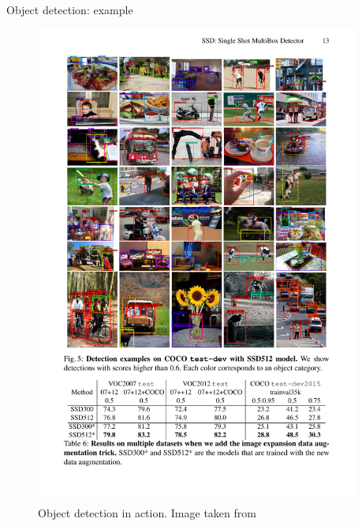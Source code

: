\documentclass[xcolor=pdftex,dvipsnames,table]{beamer}
\begin{document}
\begin{frame}{Object detection: example}
\begin{figure}[htb]
   \centering
   \includegraphics[width=0.95\textwidth]{../graphics/Detection_example2.pdf}
   \caption{Object detection in action. Image taken from \cite{Liu2016}}
\end{figure}
\end{frame}
\end{document}
